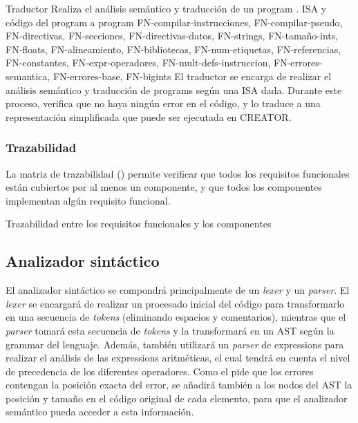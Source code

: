 \begin{component}{Traductor}
    {Realiza el análisis semántico y traducción de un \gls{program} .} %
    {\NA} %
    {\gls{ISA} y código del \gls{program} a } %
    {\Gls{program} } %
    {FN-compilar-instrucciones, FN-compilar-pseudo, FN-directivas,
    FN-secciones, FN-directivas-datos, FN-strings, FN-tamaño-ints,
    FN-floats, FN-alineamiento, FN-bibliotecas, FN-num-etiquetas,
    FN-referencias, FN-constantes, FN-expr-operadores,
    FN-mult-defs-instruccion, FN-errores-semantica, FN-errores-base, FN-bigints} %
    El traductor se encarga de realizar el análisis semántico y traducción
    de \glspl{program}  según una \gls{ISA} dada.
    Durante este proceso, verifica que no haya ningún error en el código, y lo
    traduce a una representación simplificada que puede ser ejecutada en
    CREATOR.
\end{component}

\let\componentref\undefined

\FloatBarrier

\subsubsection{Trazabilidad}

La matriz de trazabilidad () permite verificar que
todos los requisitos funcionales están cubiertos por al menos un componente, y
que todos los componentes implementan algún requisito funcional.

\begin{landscape}
        {Trazabilidad entre los requisitos funcionales y los componentes}
\end{landscape}

\FloatBarrier

\subsection{Analizador sintáctico}

El analizador sintáctico se compondrá principalmente de un \textit{\gls{lexer}}
y un \textit{\gls{parser}}. El \textit{\gls{lexer}} se encargará de realizar un
procesado inicial del código para transformarlo en una secuencia de
\textit{\glspl{token}} (eliminando espacios y comentarios), mientras que el
\textit{\gls{parser}} tomará esta secuencia de \textit{\glspl{token}} y la
transformará en un \gls{AST} según la \gls{grammar} del lenguaje. Además,
también utilizará un \textit{\gls{parser}} de \glspl{expression} para realizar
el análisis de las \glspl{expression} aritméticas, el cual tendrá en cuenta el
nivel de precedencia de los diferentes operadores. Como el
 pide que los errores contengan la posición exacta del
error, se añadirá también a los nodos del \gls{AST} la posición y tamaño en el
código original de cada elemento, para que el analizador semántico pueda acceder
a esta información.

